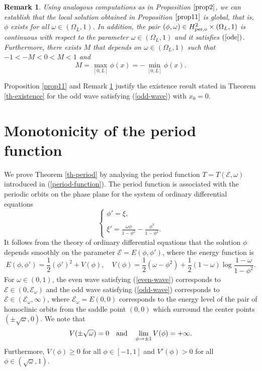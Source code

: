 \documentclass[12pt,reqno]{amsart}
\numberwithin{equation}{section}
\numberwithin{figure}{section}
\newtheorem{remark}[theorem]{Remark}
\begin{document}
\begin{remark}\label{remodd}
Using analogous computations as in Proposition $\ref{prop2}$, we can establish that the local solution obtained in Proposition $\ref{prop11}$ is global, that is, $\phi$ exists for all $\omega \in (\Omega_L,1)$. In addition, the pair $(\phi,\omega)\in H_{\rm per,o}^2\times (\Omega_L,1)$ is continuous with respect to the parameter $\omega \in (\Omega_L,1)$ and it satisfies $(\ref{ode})$. 
Furthermore, there exists $M$ that depends on $\omega \in (\Omega_L,1)$
such that $-1 < -M < 0 < M < 1$ and 
$$
M =\max_{[0,L]}\phi(x) = -\min_{[0,L]} \phi(x).
$$ 
\end{remark}

Proposition \ref{prop11} and Remark \ref{remodd} justify the existence result stated in Theorem \ref{th-existence} for the odd wave satisfying (\ref{odd-wave}) with $x_0 = 0$.
			
\section{Monotonicity of the period function}
\label{sec-3}

We prove Theorem \ref{th-period} by analysing the period function $T = T(\mathcal{E},\omega)$ introduced in (\ref{period-function}). The period function is associated with the periodic orbits on the phase plane for the system of ordinary differential equations
\begin{equation}
\label{sysode}
\left\{\begin{array}{lllll}
\phi' = \xi, \\\\
\xi'=\frac{\omega \phi}{1-\phi^2}-\frac{\phi^3}{1-\phi^2}.
\end{array}\right.
\end{equation}
It follows from the theory of ordinary differential equations that the solution $\phi$ depends smoothly on the parameter $\mathcal{E} = E(\phi,\phi')$,
where the energy function is 
\begin{equation}
\label{energy-again}
E(\phi,\phi') = \frac{1}{2} (\phi')^2 + V(\phi), \quad V(\phi) = \frac{1}{2} (\omega - \phi^2) + \frac{1}{2} (1-\omega) \log \frac{1-\omega}{1-\phi^2}.
\end{equation}
For $\omega \in (0,1)$, the even wave satisfying (\ref{even-wave}) corresponds to $\mathcal{E} \in (0,\mathcal{E}_{\omega})$ and the odd wave satisfying (\ref{odd-wave}) 
corresponds to $\mathcal{E} \in (\mathcal{E}_{\omega},\infty)$, 
where $\mathcal{E}_{\omega} = E(0,0)$ corresponds to the energy level 
of the pair of homoclinic orbits from the saddle point $(0,0)$ 
which surround the center points $(\pm \sqrt{\omega},0)$. 
We note that 
$$
V(\pm \sqrt{\omega}) = 0 \quad \mbox{\rm and} \quad 
\lim_{\phi \to \pm 1} V(\phi) = +\infty.
$$ 
Furthermore, $V(\phi) \geq 0$ for all $\phi  \in [-1,1]$ and $V'(\phi) > 0$ for all $\phi \in (\sqrt{\omega},1)$.
\end{document}
